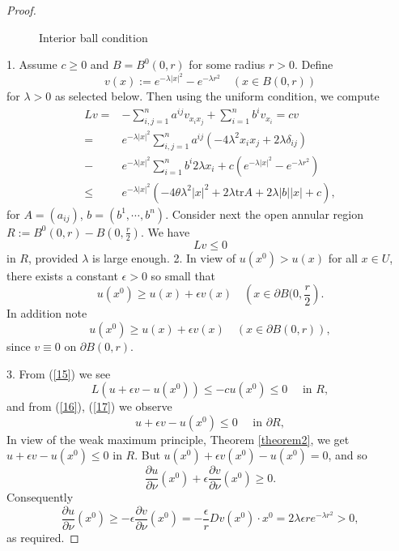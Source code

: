 \begin{proof}
\begin{figure}[ht]
    \centering
    \caption{Interior ball condition}
    \label{fig:interior-ball-condition}
\end{figure}
1. Assume $c\ge 0$ and $B=B^{0}(0,r)$ for some radius $r>0$. Define 
\[
  v(x):=e^{-\lambda\left| x \right| ^{2}}-e^{-\lambda r^{2}}\quad  \left( x\in B\left( 0,r \right)  \right) 
\] 
for $\lambda>0$ as selected below. Then using the uniform condition, we compute
\begin{align*}
  Lv=&-\sum_{i,j=1}^{n} a^{ij}v_{x_ix_j}+\sum_{i=1}^{n} b^iv_{x_i}=cv\\
  =& e^{-\lambda \left| x \right| ^{2}}\sum_{i,j=1}^{n} a^{ij}\left( -4\lambda^{2}x_ix_j+2\lambda \delta_{ij} \right) \\
  -& e^{-\lambda \left| x \right| ^2}\sum_{i=1}^{n} b^{i}2\lambda x_i +c\left( e^{-\lambda \left| x \right| ^{2}}-e^{-\lambda r^{2}} \right) \\
  \le  & e^{-\lambda \left| x \right| ^{2}}\left( -4\theta \lambda^2\left| x \right| ^2+2\lambda \text{tr}A+2\lambda \left| b \right| \left| x \right| +c \right) ,
\end{align*}
for $A=\left( a_{ij} \right) $, $b=\left( b^{1},\cdots,b^{n} \right) $. Consider next the open annular region $R:=B^{0}\left( 0,r \right) -B\left( 0,\frac{r}{2} \right) $. We have
\begin{equation}
  Lv\le 0\label{15}
\end{equation}
in $R$, provided $\lambda$ is large enough.
2. In view of  $u(x^{0})>u(x)$ for all $x\in U$, there exists a constant $\epsilon >0$ so small that 
\begin{equation}
  u(x^{0})\ge u(x)+\epsilon v(x)\quad \left( x\in \partial B(0,\frac{r}{2} \right) .\label{16}
\end{equation}
In addition note 
 \begin{equation}
   u(x^{0})\ge u(x)+\epsilon v(x)\quad\left( x\in \partial B(0,r) \right) ,\label{17}
\end{equation}
since $v\equiv 0$ on $\partial B(0,r)$.

3. From (\ref{15}) we see
\[
  L\left( u+\epsilon v-u(x^{0}) \right) \le -cu(x^{0})\le 0 \quad \text{ in }R,
\] 
and from (\ref{16}), (\ref{17}) we observe 
\[
  u+\epsilon v-u(x^{0})\le 0\quad \text{ in }\partial R,
\] 
In view of the weak maximum principle, Theorem \ref{theorem2}, we get $u+\epsilon v-u(x^{0})\le 0$ in $R$. But $u(x^{0})+\epsilon v(x^{0})-u(x^{0})=0$, and so 
\[
  \frac{\partial u}{\partial \nu} (x^{0})+\epsilon \frac{\partial v}{\partial \nu} (x^{0})\ge 0.
\] 
Consequently
\[
  \frac{\partial u}{\partial \nu} \left( x^{0} \right) \ge -\epsilon  \frac{\partial v}{\partial \nu} \left( x^{0} \right) =-\frac{\epsilon }{r}Dv(x^{0})\cdot x^{0}=2\lambda \epsilon re^{-\lambda r^{2}}>0,  
\] 
as required.
\end{proof}
